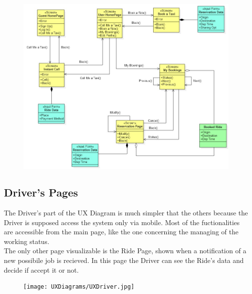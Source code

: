 \begin{figure}[h!]
\centering
		\includegraphics[width=1\textwidth]{UXDiagrams/UXBooking.jpg}
	\end{figure}

\newpage
\subsection{Driver's Pages}
The Driver's part of the UX Diagram is much simpler that the others because the Driver is supposed access the system only via mobile. Most of the fuctionalities are accessible from the main page, like the one concerning the managing of the working status. \\
The only other page visualizable is the Ride Page, shown when a notification of a new possibile job is recieved. In this page the Driver can see the Ride's data and decide if accept it or not.
\\
\begin{figure}[h!]
		\centering
		\texttt{[image: UXDiagrams/UXDriver.jpg]}
	\end{figure}